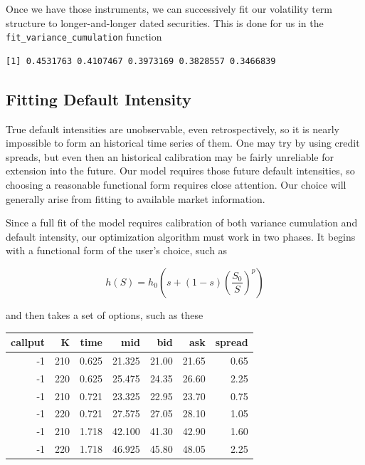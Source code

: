 \documentclass[]{article}
\newenvironment{Shaded}{\begin{snugshade}}{\end{snugshade}}
\newcommand{\KeywordTok}[1]{\textcolor[rgb]{0.13,0.29,0.53}{\textbf{#1}}}
\newcommand{\DataTypeTok}[1]{\textcolor[rgb]{0.13,0.29,0.53}{#1}}
\newcommand{\DecValTok}[1]{\textcolor[rgb]{0.00,0.00,0.81}{#1}}
\newcommand{\FloatTok}[1]{\textcolor[rgb]{0.00,0.00,0.81}{#1}}
\newcommand{\StringTok}[1]{\textcolor[rgb]{0.31,0.60,0.02}{#1}}
\newcommand{\OtherTok}[1]{\textcolor[rgb]{0.56,0.35,0.01}{#1}}
\newcommand{\OperatorTok}[1]{\textcolor[rgb]{0.81,0.36,0.00}{\textbf{#1}}}
\newcommand{\NormalTok}[1]{#1}
\begin{document}
Once we have those instruments, we can successively fit our volatility
term structure to longer-and-longer dated securities. This is done for
us in the \texttt{fit\_variance\_cumulation} function

\begin{Shaded}
\end{Shaded}

\begin{verbatim}
[1] 0.4531763 0.4107467 0.3973169 0.3828557 0.3466839
\end{verbatim}

\subsection{Fitting Default Intensity}\label{fitting-default-intensity}

True default intensities are unobservable, even retrospectively, so it
is nearly impossible to form an historical time series of them. One may
try by using credit spreads, but even then an historical calibration may
be fairly unreliable for extension into the future. Our model requires
those future default intensities, so choosing a reasonable functional
form requires close attention. Our choice will generally arise from
fitting to available market information.

Since a full fit of the model requires calibration of both variance
cumulation and default intensity, our optimization algorithm must work
in two phases. It begins with a functional form of the user's choice,
such as

\[
h(S) = h_0 \left(  s+(1-s)  \left( \frac{S_0}{S} \right)^p  \right)
\]

and then takes a set of options, such as these

\begin{longtable}[]{@{}rrrrrrr@{}}
\toprule
callput & K & time & mid & bid & ask & spread\tabularnewline
\midrule
\endhead
-1 & 210 & 0.625 & 21.325 & 21.00 & 21.65 & 0.65\tabularnewline
-1 & 220 & 0.625 & 25.475 & 24.35 & 26.60 & 2.25\tabularnewline
-1 & 210 & 0.721 & 23.325 & 22.95 & 23.70 & 0.75\tabularnewline
-1 & 220 & 0.721 & 27.575 & 27.05 & 28.10 & 1.05\tabularnewline
-1 & 210 & 1.718 & 42.100 & 41.30 & 42.90 & 1.60\tabularnewline
-1 & 220 & 1.718 & 46.925 & 45.80 & 48.05 & 2.25\tabularnewline
\bottomrule
\end{longtable}
\end{document}
